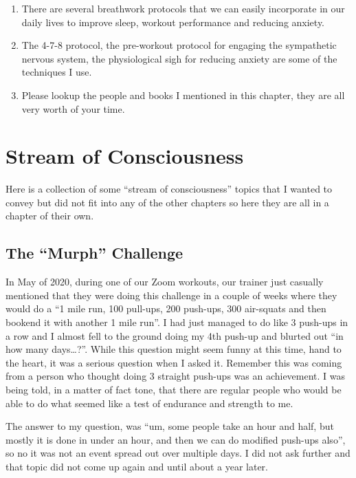\documentclass[
  oneside]{book}
\begin{document}
\begin{enumerate}
\def\labelenumi{\arabic{enumi}.}
\item
  There are several breathwork protocols that we can easily incorporate in our daily lives to improve sleep, workout performance and reducing anxiety.
\item
  The 4-7-8 protocol, the pre-workout protocol for engaging the sympathetic nervous system, the physiological sigh for reducing anxiety are some of the techniques I use.
\item
  Please lookup the people and books I mentioned in this chapter, they are all very worth of your time.
\end{enumerate}

\hypertarget{stream-of-consciousness}{%
\chapter{Stream of Consciousness}\label{stream-of-consciousness}}

Here is a collection of some ``stream of consciousness'' topics that I wanted to convey but did not fit into any of the other chapters so here they are all in a chapter of their own.

\hypertarget{the-murph-challenge}{%
\section{The ``Murph'' Challenge}\label{the-murph-challenge}}

In May of 2020, during one of our Zoom workouts, our trainer just casually mentioned that they were doing this challenge in a couple of weeks where they would do a ``1 mile run, 100 pull-ups, 200 push-ups, 300 air-squats and then bookend it with another 1 mile run''. I had just managed to do like 3 push-ups in a row and I almost fell to the ground doing my 4th push-up and blurted out ``in how many days\ldots?''. While this question might seem funny at this time, hand to the heart, it was a serious question when I asked it. Remember this was coming from a person who thought doing 3 straight push-ups was an achievement. I was being told, in a matter of fact tone, that there are regular people who would be able to do what seemed like a test of endurance and strength to me.

The answer to my question, was ``um, some people take an hour and half, but mostly it is done in under an hour, and then we can do modified push-ups also'', so no it was not an event spread out over multiple days. I did not ask further and that topic did not come up again and until about a year later.
\end{document}
